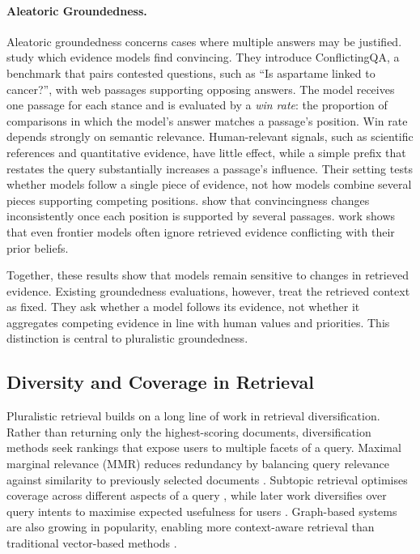 \paragraph{Aleatoric Groundedness.}
Aleatoric groundedness concerns cases where multiple answers may be justified. \citet{wan-etal-2024-evidence} study which evidence models find convincing. They introduce ConflictingQA, a benchmark that pairs contested questions, such as ``Is aspartame linked to cancer?'', with web passages supporting opposing answers. The model receives one passage for each stance and is evaluated by a \textit{win rate}: the proportion of comparisons in which the model's answer matches a passage's position. Win rate depends strongly on semantic relevance. Human-relevant signals, such as scientific references and quantitative evidence, have little effect, while a simple prefix that restates the query substantially increases a passage's influence. Their setting tests whether models follow a single piece of evidence, not how models combine several pieces supporting competing positions. \citet{naphade-2026-rational} show that convincingness changes inconsistently once each position is supported by several passages.  work shows that even frontier models often ignore retrieved evidence conflicting with their prior beliefs.

Together, these results show that models remain sensitive to changes in retrieved evidence. Existing groundedness evaluations, however, treat the retrieved context as fixed. They ask whether a model follows its evidence, not whether it aggregates competing evidence in line with human values and priorities. This distinction is central to pluralistic groundedness.

\subsection{Diversity and Coverage in Retrieval}
\label{sec_sub:pluralistic_retrieval}

Pluralistic retrieval builds on a long line of work in retrieval diversification. Rather than returning only the highest-scoring documents, diversification methods seek rankings that expose users to multiple facets of a query. Maximal marginal relevance (MMR) reduces redundancy by balancing query relevance against similarity to previously selected documents \citep{carbonell1998mmr}. Subtopic retrieval optimises coverage across different aspects of a query \citep{zhai2003subtopic}, while later work diversifies over query intents to maximise expected usefulness for users \citep{song2011postranking}. Graph-based systems are also growing in popularity, enabling more context-aware retrieval than traditional vector-based methods \citep{sarthi2024raptor, edge2024local}.

